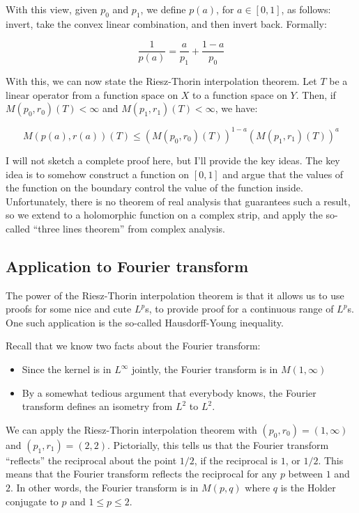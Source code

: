 \documentclass[a4paper]{amsart}
\begin{document}
With this view, given $p_0$ and $p_1$, we define $p(a)$, for $a \in
[0,1]$, as follows: invert, take the convex linear combination, and
then invert back. Formally:

$$\frac{1}{p(a)} = \frac{a}{p_1} + \frac{1-a}{p_0}$$

With this, we can now state the Riesz-Thorin interpolation
theorem. Let $T$ be a linear operator from a function space on $X$ to
a function space on $Y$. Then, if $M(p_0,r_0)(T) < \infty$
and $M(p_1,r_1)(T) < \infty$, we have:

$$M(p(a),r(a))(T) \le (M(p_0,r_0)(T))^{1-a}(M(p_1,r_1)(T))^a$$

I will not sketch a complete proof here, but I'll provide the key
ideas. The key idea is to somehow construct a function on $[0,1]$ and
argue that the values of the function on the boundary control the
value of the function inside. Unfortunately, there is no theorem of
real analysis that guarantees such a result, so we extend to a
holomorphic function on a complex strip, and apply the so-called
``three lines theorem'' from complex analysis.

\subsection{Application to Fourier transform}

The power of the Riesz-Thorin interpolation theorem is that it allows
us to use proofs for some nice and cute $L^p$s, to provide proof for a
continuous range of $L^p$s. One such application is the so-called
Hausdorff-Young inequality.

Recall that we know two facts about the Fourier transform:

\begin{itemize}

\item Since the kernel is in $L^\infty$ jointly, the Fourier transform is in $M(1,\infty)$

\item By a somewhat tedious argument that everybody knows, the Fourier
  transform defines an isometry from $L^2$ to $L^2$.

\end{itemize}

We can apply the Riesz-Thorin interpolation theorem with $(p_0,r_0) =
(1,\infty)$ and $(p_1,r_1) = (2,2)$. Pictorially, this tells us that
the Fourier transform ``reflects'' the reciprocal about the point
$1/2$, if the reciprocal is $1$, or $1/2$. This means that the Fourier
transform reflects the reciprocal for any $p$ between $1$ and $2$. In
other words, the Fourier transform is in $M(p,q)$ where $q$ is the
Holder conjugate to $p$ and $1 \le p \le 2$.
\end{document}
